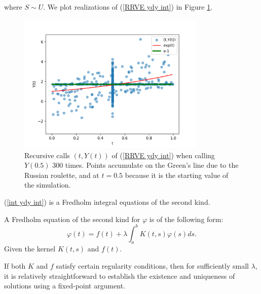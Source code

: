 \documentclass[a4paper,12pt]{article}
\begin{document}
\begin{example}[$y_t=y$ average condition]
    where $S \sim U$. We plot realizations of
    (\ref{RRVE ydy int}) in Figure \ref{fig:ydy int}.

    \begin{figure}[h!]
        \centering
        \includegraphics[width=0.8\textwidth]{plots/ydy int.png}
        \caption{Recursive calls $(t,Y(t))$ of (\ref{RRVE ydy int}) when
            calling $Y(0.5)$ $300$ times. Points accumulate on
            the Green's line due to the Russian roulette,
            and at  $t=0.5$ because it is the starting
            value of the simulation.
        }
        \label{fig:ydy int}
    \end{figure}

\end{example}

(\ref{int ydy int}) is a Fredholm integral
equations of the second kind.

\begin{definition}
    A Fredholm equation of the second kind for $\varphi$  is of the following form:
    \begin{equation}
        \varphi(t)=f(t)+\lambda \int_a^b K(t, s) \varphi(s) ds.
    \end{equation}
    Given the kernel  $K(t, s)$  and  $ f(t)$.
\end{definition}

If both $K$ and $f$ satisfy certain regularity conditions, then for sufficiently
small $\lambda$, it is relatively straightforward to establish the existence
and uniqueness of solutions using a fixed-point argument.
\end{document}
